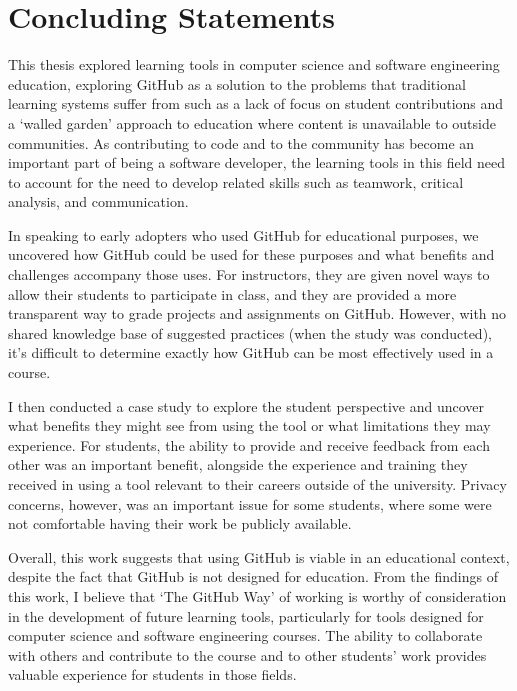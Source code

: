 \section{Concluding Statements}
This thesis explored learning tools in computer science and software engineering education, exploring GitHub as a solution to the problems that traditional learning systems suffer from such as a lack of focus on student contributions and a `walled garden' approach to education where content is unavailable to outside communities. As contributing to code and to the community has become an important part of being a software developer, the learning tools in this field need to account for the need to develop related skills such as teamwork, critical analysis, and communication.

In speaking to early adopters who used GitHub for educational purposes, we uncovered how GitHub could be used for these purposes and what benefits and challenges accompany those uses. For instructors, they are given novel ways to allow their students to participate in class, and they are provided a more transparent way to grade projects and assignments on GitHub. However, with no shared knowledge base of suggested practices (when the study was conducted), it's difficult to determine exactly how GitHub can be most effectively used in a course.

I then conducted a case study to explore the student perspective and uncover what benefits they might see from using the tool or what limitations they may experience. For students, the ability to provide and receive feedback from each other was an important benefit, alongside the experience and training they received in using a tool relevant to their careers outside of the university. Privacy concerns, however, was an important issue for some students, where some were not comfortable having their work be publicly available.

Overall, this work suggests that using GitHub is viable in an educational context, despite the fact that GitHub is not designed for education. From the findings of this work, I believe that `The GitHub Way' of working is worthy of consideration in the development of future learning tools, particularly for tools designed for computer science and software engineering courses. The ability to collaborate with others and contribute to the course and to other students' work provides valuable experience for students in those fields.
